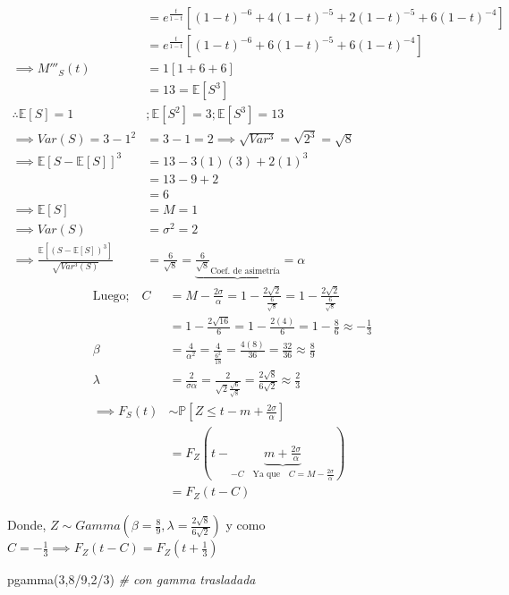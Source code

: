 \documentclass[
]{article}
\newenvironment{Shaded}{\begin{snugshade}}{\end{snugshade}}
\newcommand{\CommentTok}[1]{\textcolor[rgb]{0.56,0.35,0.01}{\textit{#1}}}
\newcommand{\DecValTok}[1]{\textcolor[rgb]{0.00,0.00,0.81}{#1}}
\newcommand{\FunctionTok}[1]{\textcolor[rgb]{0.00,0.00,0.00}{#1}}
\newcommand{\NormalTok}[1]{#1}
\newcommand{\SpecialCharTok}[1]{\textcolor[rgb]{0.00,0.00,0.00}{#1}}
\begin{document}
\begin{align*}
&= e^{\frac{t}{1 - t}} \left[(1 - t)^{-6} + 4(1 - t)^{-5} + 2(1 - t)^{-5} + 6(1 - t)^{-4}\right]\\
&= e^{\frac{t}{1 - t}} \left[(1 - t)^{-6} + 6(1 - t)^{-5} + 6(1 - t)^{-4}\right]\\
\implies M'''_{S}(t) &= 1[1 + 6 + 6]\\
&= 13 = \mathbb{E}[S^{3}]\\
\therefore \mathbb{E}[S]= 1 &; \mathbb{E}[S^{2}] = 3; \mathbb{E}[S^{3}] = 13\\
\implies Var(S) = 3 - 1^{2} &= 3 - 1 = 2 \implies \sqrt{Var^{3}} = \sqrt{2^{3}} = \sqrt{8}\\
\implies \mathbb{E}[S - \mathbb{E}[S]]^{3} &= 13 - 3(1)(3) + 2(1)^{3}\\
&= 13 - 9 +2\\
&= 6\\
\implies \mathbb{E}[S] &=  M = 1\\
\implies Var(S) &= \sigma^{2} = 2\\
\implies \frac{\mathbb{E}[(S - \mathbb{E}[S])^{3}]}{\sqrt{Var^{3}(S)}} &= \frac{6}{\sqrt{8}} = \underbrace{\frac{6}{\sqrt{8}}_{\text{Coef. de asimetría}}} = \alpha
\end{align*} \begin{align*}
\text{Luego;} \quad C &= M - \frac{2\sigma}{\alpha} = 1 - \frac{2\sqrt{2}}{\frac{6}{\sqrt{8}}} = 1 - \frac{2\sqrt{2}}{\frac{6}{\sqrt{8}}}\\
&= 1 - \frac{2\sqrt{16}}{6} = 1 - \frac{2(4)}{6} = 1 - \frac{8}{6} \approx -\frac{1}{3}\\
\beta &= \frac{4}{\alpha^{2}} = \frac{4}{\frac{6^{2}}{18}} = \frac{4(8)}{36} = \frac{32}{36} \approx \frac{8}{9}\\
\lambda &= \frac{2}{\sigma \alpha} = \frac{2}{\sqrt{2} \frac{\sqrt{6}}{\sqrt{8}}} = \frac{2 \sqrt{8}}{6\sqrt{2}} \approx \frac{2}{3}\\
\implies F_{S}(t) &\sim \mathbb{P}\left[Z \leq t - m + \frac{2\sigma}{\alpha}\right]\\
&= F_{Z}\left(t - \underbrace{m + \frac{2\sigma}{\alpha}}_{-C \quad \text{Ya que} \quad C = M - \frac{2\sigma}{\alpha}}\right)\\
&= F_{Z}(t - C)
\end{align*}

Donde,
\(Z \sim Gamma(\beta = \frac{8}{9}, \lambda = \frac{2\sqrt{8}}{6\sqrt{2}})\)
y como
\(C = -\frac{1}{3} \implies F_{Z}(t - C) = F_{Z}(t + \frac{1}{3})\)

\begin{Shaded}
\begin{Highlighting}[]
\FunctionTok{pgamma}\NormalTok{(}\DecValTok{3}\NormalTok{,}\DecValTok{8}\SpecialCharTok{/}\DecValTok{9}\NormalTok{,}\DecValTok{2}\SpecialCharTok{/}\DecValTok{3}\NormalTok{) }\CommentTok{\# con gamma trasladada}
\end{Highlighting}
\end{Shaded}
\end{document}
